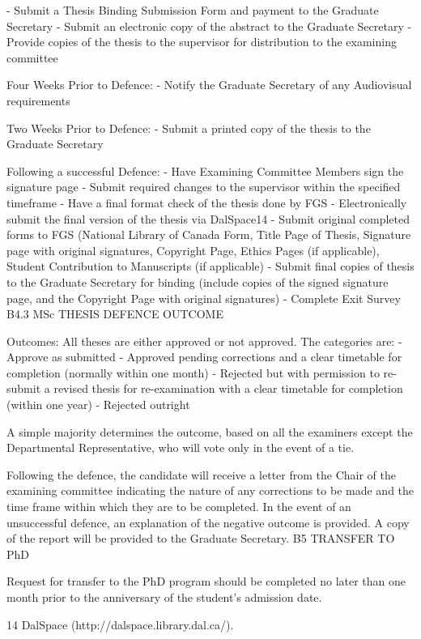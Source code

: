 -	Submit a Thesis Binding Submission Form and payment to the Graduate Secretary
-	Submit an electronic copy of the abstract to the Graduate Secretary
-	Provide copies of the thesis to the supervisor for distribution to the examining committee

Four Weeks Prior to Defence:
-	Notify the Graduate Secretary of any Audiovisual requirements

Two Weeks Prior to Defence:
-	Submit a printed copy of the thesis to the Graduate Secretary

Following a successful Defence:
-	Have Examining Committee Members sign the signature page
-	Submit required changes to the supervisor within the specified timeframe
-	Have a final format check of the thesis done by FGS
-	Electronically submit the final version of the thesis via DalSpace14
-	Submit original completed forms to FGS (National Library of Canada Form, Title Page of Thesis, Signature page with original signatures, Copyright Page, Ethics Pages (if applicable), Student Contribution to Manuscripts (if applicable)
-	Submit final copies of thesis to the Graduate Secretary for binding (include copies of the signed signature page, and the Copyright Page with original signatures)
-	Complete Exit Survey
B4.3	MSc THESIS DEFENCE OUTCOME

Outcomes: All theses are either approved or not approved. The categories are:
-	Approve as submitted
-	Approved pending corrections and a clear timetable for completion (normally within one month)
-	Rejected but with permission to re-submit a revised thesis for re-examination with a clear timetable for completion (within one year)
-	Rejected outright

A simple majority determines the outcome, based on all the examiners except the Departmental Representative, who will vote only in the event of a tie.

Following the defence, the candidate will receive a letter from the Chair of the examining committee indicating the nature of any corrections to be made and the time frame within which they are to be completed. In the event of an unsuccessful defence, an explanation of the negative outcome is provided. A copy of the report will be provided to the Graduate Secretary.
B5	TRANSFER TO PhD

Request for transfer to the PhD program should be completed no later than one month prior to the anniversary of the student’s admission date.



14 DalSpace (http://dalspace.library.dal.ca/).
 

